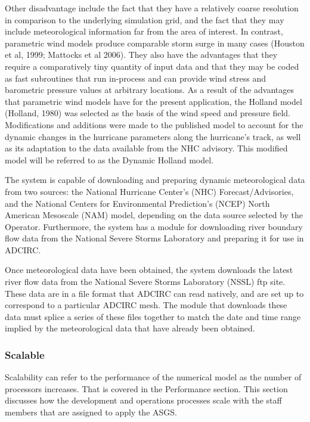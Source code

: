 \documentclass[12pt]{article}
\begin{document}
Other disadvantage include the fact that they have a relatively 
coarse resolution in comparison to the underlying simulation grid, 
and the fact that they may include meteorological information far 
from the area of interest. In contrast, parametric wind models 
produce comparable storm surge in many cases (Houston et al, 1999; 
Mattocks et al 2006). They also have the advantages that they 
require a comparatively tiny quantity of input data and that they 
may be coded as fast subroutines that run in-process and can provide 
wind stress and barometric pressure values at arbitrary locations. 
As a result of the advantages that parametric wind models have for 
the present application, the Holland model (Holland, 1980) was 
selected as the basis of the wind speed and pressure field. 
Modifications and additions were made to the published model to 
account for the dynamic changes in the hurricane parameters along 
the hurricane’s track, as well as its adaptation to the data 
available from the NHC advisory. This modified model will be 
referred to as the Dynamic Holland model.

The system is capable of downloading and preparing dynamic 
meteorological data from two sources: the National Hurricane 
Center's (NHC) Forecast/Advisories, and the National Centers for 
Environmental Prediction's (NCEP) North American Mesoscale (NAM) 
model, depending on the data source selected by the Operator. 
Furthermore, the system has a module for downloading river boundary 
flow data from the National Severe Storms Laboratory and preparing 
it for use in ADCIRC.

Once meteorological data have been obtained, the system downloads 
the latest river flow data from the National Severe Storms 
Laboratory (NSSL) ftp site. These data are in a file format that 
ADCIRC can read natively, and are set up to correspond to a 
particular ADCIRC mesh. The module that downloads these data must 
splice a series of these files together to match the date and time 
range implied by the meteorological data that have already been 
obtained. 


\subsubsection{Scalable}

Scalability can refer to the performance of the numerical model as 
the number of processors increases. That is covered in the 
Performance section. This section discusses how the development and
operations processes scale with the staff members that are assigned 
to apply the ASGS. 
\end{document}
